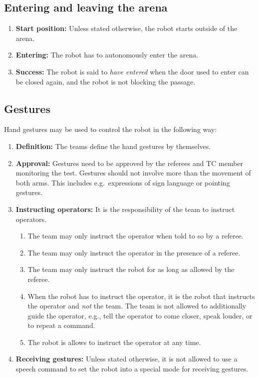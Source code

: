 \subsection{Entering and leaving the arena}
\label{rule:start_position}
\begin{enumerate}
	\item \textbf{Start position:} Unless stated otherwise, the robot starts outside of the arena.
	\item \textbf{Entering:} The robot has to autonomously enter the arena.
	\item \textbf{Success:} The robot is said to \emph{have entered} when the door used to enter can be closed again, and the robot is not blocking the passage.
\end{enumerate}



\subsection{Gestures}
\label{rule:gestures}
Hand gestures may be used to control the robot in the following way:
\begin{enumerate}
	\item \textbf{Definition:} The teams define the hand gestures by themselves.

	\item \textbf{Approval:} Gestures need to be approved by the referees and TC member monitoring the test. Gestures should not involve more than the movement of both arms. This includes e.g.~expressions of sign language or pointing gestures.

	\item \textbf{Instructing operators:} It is the responsibility of the team to instruct operators.
	\begin{enumerate}
		\item The team may only instruct the operator when told to so by a referee.
		\item The team may only instruct the operator in the presence of a referee.
		\item The team may only instruct the robot for as long as allowed by the referee.
		\item When the robot has to instruct the operator, it is the robot that instructs the operator and \emph{not} the team. The team is not allowed to additionally guide the operator, e.g., tell the operator to come closer, speak louder, or to repeat a command.
		\item The robot is allows to instruct the operator at any time.
	\end{enumerate}

	\item \textbf{Receiving gestures:} Unless stated otherwise, it is not allowed to use a speech command to set the robot into a special mode for receiving gestures.
\end{enumerate}



